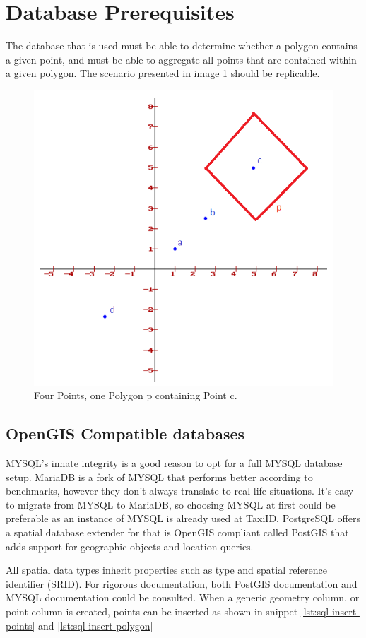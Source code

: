 %
\section{Database Prerequisites}
The database that is used must be able to determine whether a polygon contains a given point, and must be able to aggregate all points that are contained within a given polygon. The scenario presented in image \ref{fig:square} should be replicable.

\begin{figure}[htbp!]
	\centering
	\includegraphics[width=.5\textwidth]{Square}
	\caption[Square]{Four Points, one Polygon p containing Point c.}
	\label{fig:square}
\end{figure}

\subsection{OpenGIS Compatible databases}
MYSQL’s innate integrity is a good reason to opt for a full MYSQL database setup. MariaDB is a fork of MYSQL that performs better according to benchmarks, however they don’t always translate to real life situations. It’s easy to migrate from MYSQL to MariaDB, so choosing MYSQL at first could be preferable as an instance of MYSQL is already used at TaxiID. PostgreSQL offers a spatial database extender for that is OpenGIS compliant called PostGIS that adds support for geographic objects and location queries.

All spatial data types inherit properties such as type and spatial reference identifier (SRID). For rigorous documentation, both PostGIS documentation \cite{PostGIS} and MYSQL documentation \cite{MySQL} could be consulted. When a generic geometry column, or point column is created, points can be inserted as shown in snippet \ref{lst:sql-insert-points} and \ref{lst:sql-insert-polygon}

